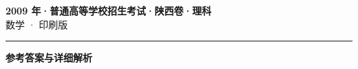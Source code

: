 \documentclass[zihao=5, a4paper]{ctexart}
\begin{document}
\begin{center}
  {\Large\bfseries 2009 年·普通高等学校招生考试·陕西卷·理科}\\[4pt]
  {\large 数学 · 印刷版}
\end{center}
\medskip
{}

\par\bigskip\hrule\bigskip
{}
\begin{center}{\large\bfseries 参考答案与详细解析}\end{center}
\smallskip

\end{document}
